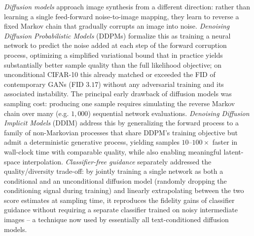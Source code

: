 \textit{Diffusion models} approach image synthesis from a different direction: rather than learning a single feed-forward noise-to-image mapping, they learn to reverse a fixed Markov chain that gradually corrupts an image into noise. \textit{Denoising Diffusion Probabilistic Models} (DDPMs) \cite{hoDenoisingDiffusionProbabilistic2020} formalize this as training a neural network to predict the noise added at each step of the forward corruption process, optimizing a simplified variational bound that in practice yields substantially better sample quality than the full likelihood objective; on unconditional CIFAR-10 this already matched or exceeded the FID of contemporary GANs (FID $3.17$) without any adversarial training and its associated instability. The principal early drawback of diffusion models was sampling cost: producing one sample requires simulating the reverse Markov chain over many (e.g. $1{,}000$) sequential network evaluations. \textit{Denoising Diffusion Implicit Models} (DDIM) \cite{songDenoisingDiffusionImplicit2022} address this by generalizing the forward process to a family of non-Markovian processes that share DDPM's training objective but admit a deterministic generative process, yielding samples $10$--$100\times$ faster in wall-clock time with comparable quality, while also enabling meaningful latent-space interpolation. \textit{Classifier-free guidance} \cite{hoClassifierFreeDiffusionGuidance2022} separately addressed the quality/diversity trade-off: by jointly training a single network as both a conditional and an unconditional diffusion model (randomly dropping the conditioning signal during training) and linearly extrapolating between the two score estimates at sampling time, it reproduces the fidelity gains of classifier guidance without requiring a separate classifier trained on noisy intermediate images -- a technique now used by essentially all text-conditioned diffusion models.


